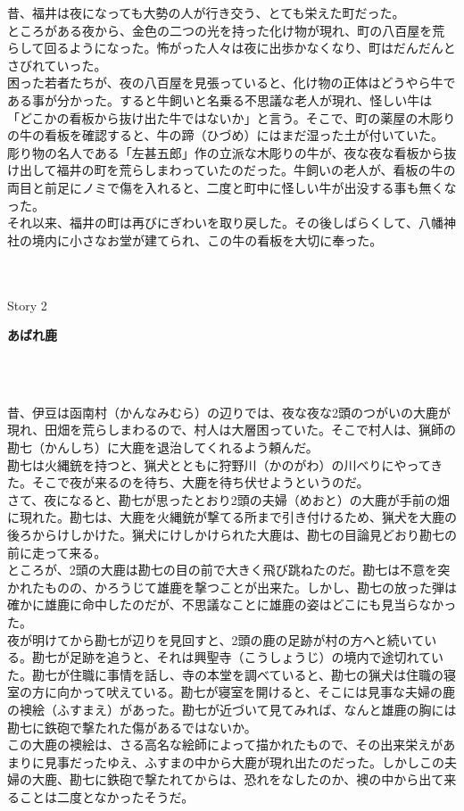 \begin{CJK}{UTF8}{ipxm}
昔、福井は夜になっても大勢の人が行き交う、とても栄えた町だった。\\
ところがある夜から、金色の二つの光を持った化け物が現れ、町の八百屋を荒らして回るようになった。怖がった人々は夜に出歩かなくなり、町はだんだんとさびれていった。\\
困った若者たちが、夜の八百屋を見張っていると、化け物の正体はどうやら牛である事が分かった。すると牛飼いと名乗る不思議な老人が現れ、怪しい牛は「どこかの看板から抜け出た牛ではないか」と言う。そこで、町の薬屋の木彫りの牛の看板を確認すると、牛の蹄（ひづめ）にはまだ湿った土が付いていた。\\
彫り物の名人である「左甚五郎」作の立派な木彫りの牛が、夜な夜な看板から抜け出して福井の町を荒らしまわっていたのだった。牛飼いの老人が、看板の牛の両目と前足にノミで傷を入れると、二度と町中に怪しい牛が出没する事も無くなった。\\
それ以来、福井の町は再びにぎわいを取り戻した。その後しばらくして、八幡神社の境内に小さなお堂が建てられ、この牛の看板を大切に奉った。\\
\end{CJK}\\ \\
Story 2 
\begin{CJK}{UTF8}{ipxm}
\textbf{あばれ鹿}
\end{CJK}\\ \\
\begin{CJK}{UTF8}{ipxm}
昔、伊豆は函南村（かんなみむら）の辺りでは、夜な夜な2頭のつがいの大鹿が現れ、田畑を荒らしまわるので、村人は大層困っていた。そこで村人は、猟師の勘七（かんしち）に大鹿を退治してくれるよう頼んだ。\\
勘七は火縄銃を持つと、猟犬とともに狩野川（かのがわ）の川べりにやってきた。そこで夜が来るのを待ち、大鹿を待ち伏せようというのだ。\\
さて、夜になると、勘七が思ったとおり2頭の夫婦（めおと）の大鹿が手前の畑に現れた。勘七は、大鹿を火縄銃が撃てる所まで引き付けるため、猟犬を大鹿の後ろからけしかけた。猟犬にけしかけられた大鹿は、勘七の目論見どおり勘七の前に走って来る。\\
ところが、2頭の大鹿は勘七の目の前で大きく飛び跳ねたのだ。勘七は不意を突かれたものの、かろうじて雄鹿を撃つことが出来た。しかし、勘七の放った弾は確かに雄鹿に命中したのだが、不思議なことに雄鹿の姿はどこにも見当らなかった。\\
夜が明けてから勘七が辺りを見回すと、2頭の鹿の足跡が村の方へと続いている。勘七が足跡を追うと、それは興聖寺（こうしょうじ）の境内で途切れていた。勘七が住職に事情を話し、寺の本堂を調べていると、勘七の猟犬は住職の寝室の方に向かって吠えている。勘七が寝室を開けると、そこには見事な夫婦の鹿の襖絵（ふすまえ）があった。勘七が近づいて見てみれば、なんと雄鹿の胸には勘七に鉄砲で撃たれた傷があるではないか。\\
この大鹿の襖絵は、さる高名な絵師によって描かれたもので、その出来栄えがあまりに見事だったゆえ、ふすまの中から大鹿が現れ出たのだった。しかしこの夫婦の大鹿、勘七に鉄砲で撃たれてからは、恐れをなしたのか、襖の中から出て来ることは二度となかったそうだ。\\
\end{CJK}\\

